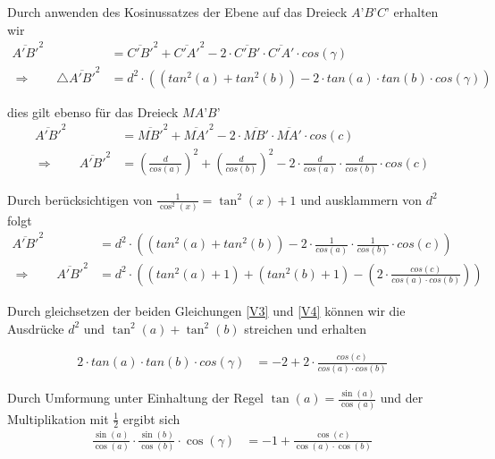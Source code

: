 \begin{refsection}
Durch anwenden des Kosinussatzes der Ebene auf das Dreieck $A’B’C’$ erhalten wir
\begin{align}
\overline{A'B'}^{ 2 } &= \overline{ C'B' }^{ 2 } + \overline{ C'A' }^{ 2 } - 2 \cdot \overline{C'B'} \cdot \overline{ C'A' } \cdot cos(\gamma) \nonumber \\ 
\Rightarrow \quad \quad
\triangle \overline{A'B'}^{ 2 } &= d^{ 2 } \cdot \left(\left(tan^{ 2 }(a) + tan^{ 2 }(b)\right) - 2\cdot tan(a) \cdot tan(b) \cdot cos(\gamma)\right) 
\label {V3} 
\end{align}

dies gilt ebenso für das Dreieck $MA’B’$
\begin{align*}
\overline{A'B'}^{2} &= \overline{MB'}^{2} + \overline{MA'}^{2} - 2\cdot \overline{MB'} \cdot \overline{MA'} \cdot cos(c) \\
\Rightarrow \quad \quad
\overline{A'B'}^{ 2 } &= \left(\frac{ d }{ cos(a) }  \right)^{ 2 } + \left(\frac{ d }{ cos(b)}  \right)^{ 2 } - 2 \cdot \frac{ d }{ cos(a)} \cdot \frac{ d }{ cos(b)} \cdot cos(c) 
\end{align*}

Durch berücksichtigen von $\frac{1}{\cos^{2}(x)}=\tan^{2}(x)+1$ und ausklammern von $d^2$ folgt
\begin{align}
\overline{ A'B'}^{ 2 } &= d^{ 2 } \cdot \left(\left(tan^{ 2 }(a) + tan^{ 2 }(b)\right) - 2 \cdot \frac{ 1 }{ cos(a)} \cdot \frac{ 1 }{ cos(b)} \cdot cos(c)\right) 
\nonumber \\
\Rightarrow \quad \quad
\overline{ A'B'}^{ 2 } &= d^{ 2 } \cdot \left(\left(tan^{ 2 }(a) + 1\right) + \left(tan^{ 2 }(b) + 1\right) - \left(2 \cdot \frac{cos(c)}{cos(a) \cdot cos(b)}\right)\right)
\label {V4}
\end{align}

Durch gleichsetzen der beiden Gleichungen \eqref{V3} und \eqref{V4} können wir die Ausdrücke $d^2$ und $\tan^2(a) + \tan^2(b)$ streichen und erhalten

\begin{align*}
2 \cdot tan(a) \cdot tan(b) \cdot cos(\gamma) &= -2+2 \cdot \frac{cos(c)}{cos(a) \cdot cos(b)}
\end{align*}

Durch Umformung unter Einhaltung der Regel $\tan(a)=\frac{\sin(a)}{\cos(a)}$ und der Multiplikation mit  $\frac{1}{2}$ ergibt sich
\begin{align*}
\frac{\sin(a)}{\cos(a)} \cdot \frac{\sin(b)}{\cos(b)} \cdot \cos(\gamma) &= -1 + \frac{\cos(c)}{\cos(a) \cdot \cos(b)}
\end{align*}


\end{refsection}
